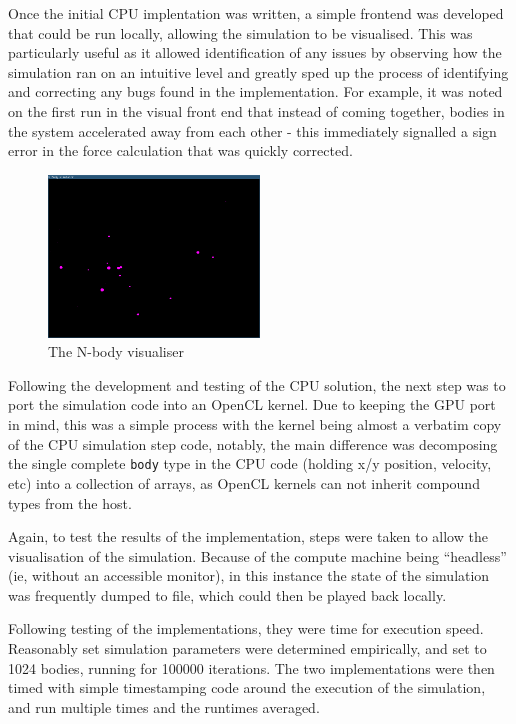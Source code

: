 \documentclass[journal,transmag]{IEEEtran}
\begin{document}
    Once the initial CPU implentation was written, a simple frontend was developed that could be run locally, allowing
    the simulation to be visualised. This was particularly useful as it allowed identification of any issues by
    observing how the simulation ran on an intuitive level and greatly sped up the process of identifying and
    correcting any bugs found in the implementation. For example, it was noted on the first run in the visual front end
    that instead of coming together, bodies in the system accelerated away from each other - this immediately signalled
    a sign error in the force calculation that was quickly corrected.

    \begin{figure}[h]
        \centering
        \includegraphics[width=0.5\textwidth]{report/images/nbody_vis.png}
        \caption{The N-body visualiser}
    \end{figure}

    Following the development and testing of the CPU solution, the next step was to port the simulation code into an
    OpenCL kernel. Due to keeping the GPU port in mind, this was a simple process with the kernel being almost a
    verbatim copy of the CPU simulation step code, notably, the main difference was decomposing the single complete
    \texttt{body} type in the CPU code (holding x/y position, velocity, etc) into a collection of arrays, as OpenCL
    kernels can not inherit compound types from the host.

    Again, to test the results of the implementation, steps were taken to allow the visualisation of the simulation.
    Because of the compute machine being ``headless'' (ie, without an accessible monitor), in this instance the state
    of the simulation was frequently dumped to file, which could then be played back locally.

    Following testing of the implementations, they were time for execution speed. Reasonably set simulation parameters
    were determined empirically, and set to 1024 bodies, running for 100000 iterations. The two implementations were
    then timed with simple timestamping code around the execution of the simulation, and run multiple times and the
    runtimes averaged.
\end{document}
